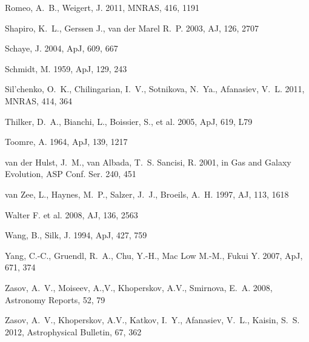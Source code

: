 \documentclass[russian,12pt]{article}
\begin{document}
\begin{thebibliography}{99}
    {Romeo}, A.~B., {Weigert}, J. 2011, MNRAS, 416, 1191

    {Shapiro}, K.~L., {Gerssen} J., {van der Marel} R.~P. 
    2003, AJ, 126, 2707
    
    {Schaye}, J. 2004, ApJ, 609, 667

    {Schmidt}, M. 1959, ApJ, 129, 243

   {Sil'chenko}, O.~K., {Chilingarian}, I.~V., {Sotnikova}, N.~Ya., 
   {Afanasiev}, V.~L. 2011, MNRAS, 414, 364

    {Thilker}, D.~A., {Bianchi}, L., {Boissier}, S., et al. 
    2005, ApJ, 619, L79

    {Toomre}, A. 1964, ApJ, 139, 1217

   {van der Hulst}, J.~M., {van Albada}, T.~S. {Sancisi}, R. 2001,
   in Gas and Galaxy Evolution, ASP Conf. Ser. 240, 451

    {van Zee}, L., {Haynes}, M.~P., {Salzer}, J.~J., 
    {Broeils}, A.~H. 1997, AJ, 113, 1618

    {Walter} F. et al. 2008, AJ, 136, 2563	       

    {Wang}, B., {Silk}, J. 1994, ApJ, 427, 759

    {Yang}, C.-C., {Gruendl}, R.~A., {Chu}, Y.-H., 
    {Mac Low} M.-M., {Fukui} Y. 2007, ApJ, 671, 374

    {Zasov}, A.~V., {Moiseev}, A.,V., {Khoperskov}, A.V., 
    {Smirnova}, E.~A. 2008, Astronomy Reports, 52, 79
    
    {Zasov}, A.~V., {Khoperskov}, A.V., {Katkov}, I.~Y., 
    {Afanasiev}, V.~L., {Kaisin}, S.~S. 2012, 
    Astrophysical Bulletin, 67, 362

\end{thebibliography}
\end{document}
